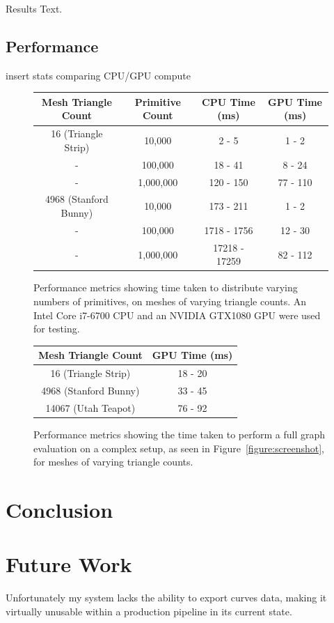 \documentclass[]{acmsiggraph}
\begin{document}
Results Text.

\subsection{Performance} \label{sec:performance}

insert stats comparing CPU/GPU compute

\begin{figure}[htbp]\centering
\begin{center}
\begin{tabular}{||c||c|c|c||}
\hline
Mesh Triangle Count & Primitive Count & CPU Time (ms) & GPU Time (ms)\\
\hline
\hline
16 (Triangle Strip) & 10,000 & 2 - 5 & 1 - 2\\
\hline
 - & 100,000 & 18 - 41 & 8 - 24\\
\hline
 - & 1,000,000 & 120 - 150 & 77 - 110\\
\hline
4968 (Stanford Bunny) & 10,000 & 173 - 211 & 1 - 2\\
\hline
 - & 100,000 & 1718 - 1756 & 12 - 30\\
\hline
 - & 1,000,000 & 17218 - 17259 & 82 - 112\\
\hline
\end{tabular}
\caption{\label{figure:distributionPerformance} Performance metrics showing time taken to distribute varying numbers of primitives, on meshes of varying triangle counts. An Intel Core i7-6700 CPU and an NVIDIA GTX1080 GPU were used for testing.}
\end{center}
\end{figure}

\begin{figure}[htbp]\centering
\begin{center}
\begin{tabular}{||c|c||}
\hline
Mesh Triangle Count & GPU Time (ms)\\
\hline
\hline
16 (Triangle Strip) & 18 - 20\\
\hline
4968 (Stanford Bunny) & 33 - 45\\
\hline
14067 (Utah Teapot) & 76 - 92\\
\hline
\end{tabular}
\caption{\label{figure:fullPerformance} Performance metrics showing the time taken to perform a full graph evaluation on a complex setup, as seen in Figure~\ref{figure:screenshot}, for meshes of varying triangle counts.}
\end{center}
\end{figure}

\section{Conclusion} \label{sec:conclusion}

\section{Future Work} \label{sec:futurework}

Unfortunately my system lacks the ability to export curves data, making it virtually unusable within a production pipeline in its current state.



\end{document}
